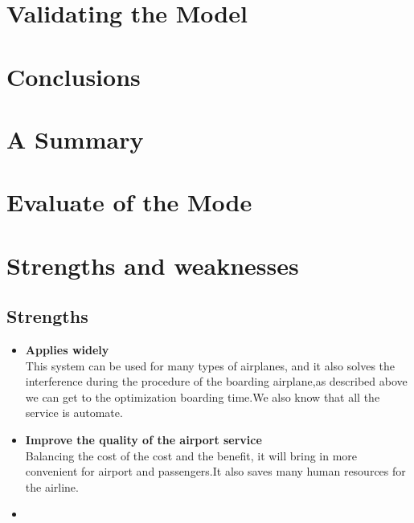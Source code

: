 \documentclass{mcmthesis}
\begin{document}
\section{Validating the Model}
\lipsum[9]

\section{Conclusions}
\lipsum[6]

\section{A Summary}
\lipsum[6]

\section{Evaluate of the Mode}

\section{Strengths and weaknesses}
\lipsum[12]

\subsection{Strengths}
\begin{itemize}
\item \textbf{Applies widely}\\
This  system can be used for many types of airplanes, and it also
solves the interference during  the procedure of the boarding
airplane,as described above we can get to the  optimization
boarding time.We also know that all the service is automate.
\item \textbf{Improve the quality of the airport service}\\
Balancing the cost of the cost and the benefit, it will bring in
more convenient  for airport and passengers.It also saves many
human resources for the airline. \item \textbf{}
\end{itemize}


\end{document}
